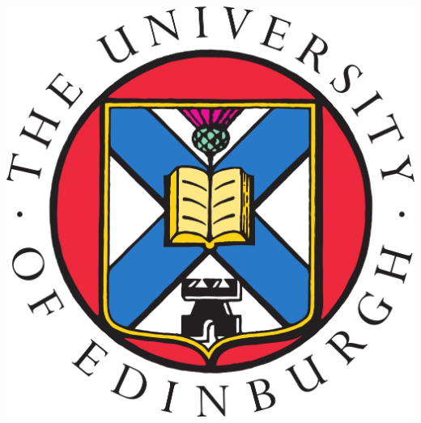 \begin{center}
     {\includegraphics[scale=0.2]{figs/University_of_Edinburgh_logo}}
\end{center}

\newpage
